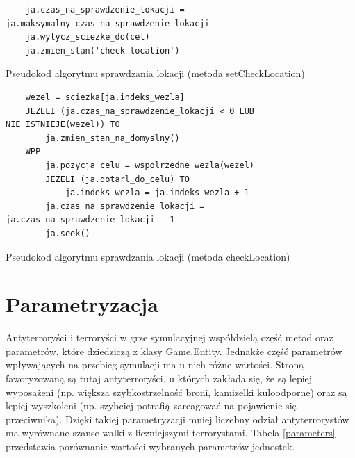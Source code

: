 \begin{table}
\begin{center}
\begin{lstlisting}
	ja.czas_na_sprawdzenie_lokacji = ja.maksymalny_czas_na_sprawdzenie_lokacji
	ja.wytycz_sciezke_do(cel)
	ja.zmien_stan('check location')
\end{lstlisting}
\caption {Pseudokod algorytmu sprawdzania lokacji (metoda setCheckLocation)}\label{checkLocationSet}
\label{attackCode}
\end{center}
\end{table}


\begin{table}
\begin{center}
\begin{lstlisting}
	wezel = sciezka[ja.indeks_wezla]
	JEZELI (ja.czas_na_sprawdzenie_lokacji < 0 LUB NIE_ISTNIEJE(wezel)) TO
		ja.zmien_stan_na_domyslny()	
	WPP
		ja.pozycja_celu = wspolrzedne_wezla(wezel)
		JEZELI (ja.dotarl_do_celu) TO
			ja.indeks_wezla = ja.indeks_wezla + 1
		ja.czas_na_sprawdzenie_lokacji = ja.czas_na_sprawdzenie_lokacji - 1
		ja.seek()	
\end{lstlisting}
\caption {Pseudokod algorytmu sprawdzania lokacji (metoda checkLocation)}\label{checkLocationDo}
\label{attackCode}
\end{center}
\end{table}


\section{Parametryzacja}

Antyterroryści i terroryści w grze symulacyjnej współdzielą część metod oraz parametrów, które dziedziczą z klasy Game.Entity. Jednakże część parametrów wpływających na przebieg symulacji ma u nich różne wartości. Stroną faworyzowaną są tutaj antyterroryści, u których zakłada się, że są lepiej wyposażeni (np. większa szybkostrzelność broni, kamizelki kuloodporne) oraz są lepiej wyszkoleni (np. szybciej potrafią zareagować na pojawienie się przeciwnika). Dzięki takiej parametryzacji mniej liczebny odział antyterrorystów ma wyrównane szanse walki z liczniejszymi terrorystami. Tabela \ref{parameters} przedstawia porównanie wartości wybranych parametrów jednostek.

